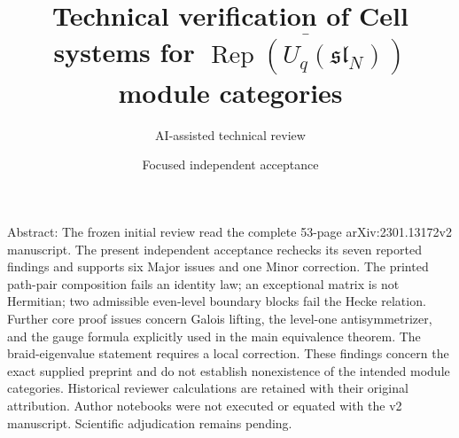 \documentclass[10pt]{article}
\title{Technical verification of
Cell systems for \(\overline{\operatorname{Rep}(U_q(\mathfrak{sl}_N))}\) module categories}
\author{AI-assisted technical review}
\date{Focused independent acceptance}
\begin{document}
\maketitle
Abstract: The frozen initial review read the complete 53-page arXiv:2301.13172v2 manuscript. The present independent acceptance rechecks its seven reported findings and supports six Major issues and one Minor correction. The printed path-pair composition fails an identity law; an exceptional matrix is not Hermitian; two admissible even-level boundary blocks fail the Hecke relation. Further core proof issues concern Galois lifting, the level-one antisymmetrizer, and the gauge formula explicitly used in the main equivalence theorem. The braid-eigenvalue statement requires a local correction. These findings concern the exact supplied preprint and do not establish nonexistence of the intended module categories. Historical reviewer calculations are retained with their original attribution. Author notebooks were not executed or equated with the v2 manuscript. Scientific adjudication remains pending.\par
\end{document}
